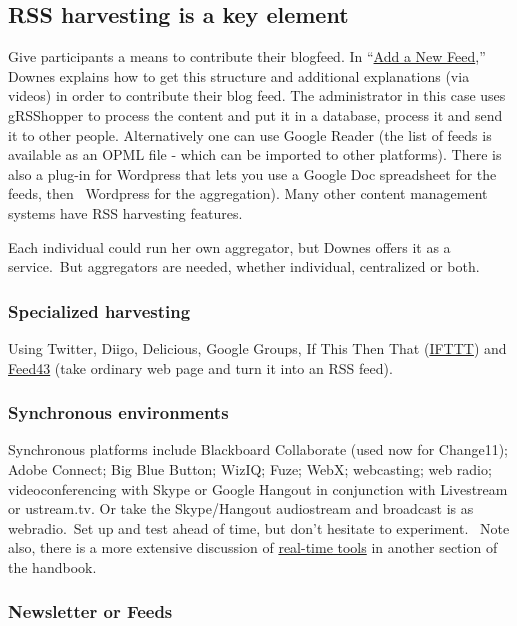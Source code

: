 \subsection{RSS harvesting is a key
element}\label{rss-harvesting-is-a-key-element}

Give participants a means to contribute their blogfeed. In
``\href{http://change.mooc.ca/new_feed.htm}{Add a New Feed},'' Downes
explains how to get this structure and additional explanations (via
videos) in order to contribute their blog feed. The administrator in
this case uses gRSShopper to process the content and put it in a
database, process it and send it to other people. Alternatively one can
use Google Reader (the list of feeds is available as an OPML file -
which can be imported to other platforms). There is also a plug-in for
Wordpress that lets you use a Google Doc spreadsheet for the feeds, then
~Wordpress for the aggregation). Many other content management systems
have RSS harvesting features.

Each individual could run her own aggregator, but Downes offers it as a
service.~But aggregators are needed, whether individual, centralized or
both.

\subsubsection{Specialized harvesting}\label{specialized-harvesting}

Using Twitter, Diigo, Delicious, Google Groups, If This Then That
(\href{http://ifttt.com}{IFTTT}) and \href{http://feed43.com}{Feed43}
(take ordinary web page and turn it into an RSS feed).

\subsubsection{Synchronous environments}\label{synchronous-environments}

Synchronous platforms include Blackboard Collaborate (used now for
Change11); Adobe Connect; Big Blue Button; WizIQ; Fuze; WebX;
webcasting; web radio; videoconferencing with Skype or Google Hangout in
conjunction with Livestream or ustream.tv. Or take the Skype/Hangout
audiostream and broadcast is as webradio.~Set up and test ahead of time,
but don't hesitate to experiment.~ Note also, there is a more extensive
discussion of \href{http://peeragogy.org/real-time-meetings/}{real-time
tools} in another section of the handbook.

\subsubsection{Newsletter or Feeds}\label{newsletter-or-feeds}

